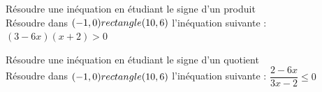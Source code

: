 \begin{Méthode}Résoudre une inéquation en étudiant le signe d'un produit \\
Résoudre dans $(-1,0) rectangle (10,6)$ l'inéquation suivante : $(3-6x)(x+2)>0$
\vspace{0.2cm}

\ligne

\ligne

\ligne

\ligne

\ligne

\ligne

\ligne

\ligne

\ligne

\ligne

\ligne

\ligne

\ligne

\ligne

\ligne

\end{Méthode}

\begin{Méthode}Résoudre une inéquation en étudiant le signe d'un quotient \\
Résoudre dans $(-1,0) rectangle (10,6)$ l'inéquation suivante : $\dfrac{2-6x}{3x-2}\leq 0$
\vspace{0.5cm}

\ligne

\ligne

\ligne

\ligne

\ligne

\ligne

\ligne

\ligne

\ligne

\ligne

\ligne

\ligne

\ligne

\ligne

\ligne

\ligne

\ligne

\end{Méthode}

\bigskip

\newpage

